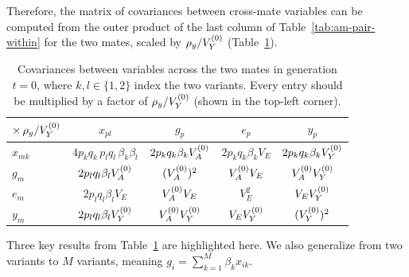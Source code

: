 \documentclass[12pt]{article}
\numberwithin{equation}{section}
\begin{document}
Therefore, the matrix of covariances between cross-mate variables can be computed from the outer product of the last column of Table~\ref{tab:am-pair-within} for the two mates, scaled by $\rho_y / V_Y^{(0)}$ (Table~\ref{tab:am-pair-between}).

\begin{table}[H]
    \begin{floatcard}
    \renewcommand{\arraystretch}{1.4}
    \setlength{\tabcolsep}{4pt}
    \footnotesize
    \begin{tabular}{l|cccc}
        $\times\, \rho_y / V_Y^{(0)}$ & $x_{pl}$ & $g_p$ & $e_p$ & $y_p$ \\
        \hline
        $x_{mk}$ & $4p_k q_k\,p_l q_l\,\beta_k\beta_l$ & $2p_k q_k\beta_kV_A^{(0)}$ & $2p_k q_k\beta_k V_E$ & $2p_k q_k\beta_kV_Y^{(0)}$ \\
        $g_m$    & $2p_l q_l\beta_lV_A^{(0)}$ & $(V_A^{(0)})^2$ & $V_A^{(0)} V_E$ & $V_A^{(0)}V_Y^{(0)}$ \\
        $e_m$    & $2p_l q_l\beta_l V_E$ & $V_A^{(0)} V_E$ & $V_E^2$ & $V_EV_Y^{(0)}$ \\
        $y_m$    & $2p_l q_l\beta_lV_Y^{(0)}$ & $V_A^{(0)}V_Y^{(0)}$ & $V_EV_Y^{(0)}$ & $(V_Y^{(0)})^2$ \\
    \end{tabular}
    \caption{%
        Covariances between variables across the two mates in generation $t=0$, where $k, l \in \{1, 2\}$ index the two variants.
        Every entry should be multiplied by a factor of $\rho_y/V_Y^{(0)}$ (shown in the top-left corner).%
    }
    \label{tab:am-pair-between}
    \end{floatcard}
\end{table}

Three key results from Table~\ref{tab:am-pair-between} are highlighted here.
We also generalize from two variants to $M$ variants, meaning $g_i = \sum_{k=1}^{M} \beta_k x_{ik}$.
\end{document}
